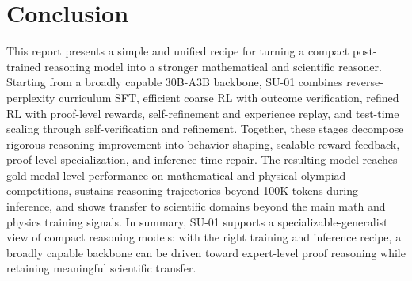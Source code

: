\section{Conclusion}

This report presents a simple and unified recipe for turning a compact
post-trained reasoning model into a stronger mathematical and scientific
reasoner. Starting from a broadly capable 30B-A3B backbone, SU-01 combines
reverse-perplexity curriculum SFT, efficient coarse RL with outcome verification,
refined RL with proof-level rewards, self-refinement and experience replay, and
test-time scaling through self-verification and refinement. Together, these
stages decompose rigorous reasoning improvement into behavior shaping, scalable
reward feedback, proof-level specialization, and inference-time repair. 
The resulting model reaches gold-medal-level performance on mathematical and
physical olympiad competitions, sustains reasoning trajectories beyond 100K
tokens during inference, and shows transfer to scientific domains beyond the
main math and physics training signals. 
In summary, SU-01 supports a specializable-generalist view of compact reasoning models: with the right training and inference recipe, a broadly capable backbone can be driven toward expert-level proof reasoning while retaining meaningful scientific transfer.


